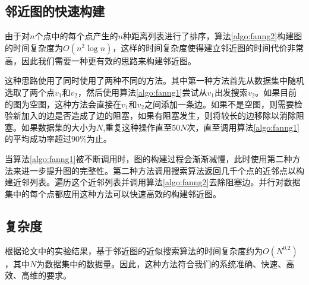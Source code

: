 \subsection{邻近图的快速构建}

由于对$n$个点中的每个点产生的$n$种距离列表进行了排序，算法\ref{algo:fanng2}构建图的时间复杂度为$O(n^2\log{n})$，这样的时间复杂度使得建立邻近图的时间代价非常高，因此我们需要一种更有效的思路来构建邻近图。

这种思路使用了同时使用了两种不同的方法。其中第一种方法首先从数据集中随机选取了两个点$v_1$和$v_2$，然后使用算法\ref{algo:fanng1}尝试从$v_1$出发搜索$v_2$。如果目前的图为空图，这种方法会直接在$v_1$和$v_2$之间添加一条边。如果不是空图，则需要检验新加入的边是否造成了边的阻塞，如果有阻塞发生，则将较长的边移除以消除阻塞。如果数据集的大小为$N$,重复这种操作直至$50N$次，直至调用算法\ref{algo:fanng1}的平均成功率超过$90\%$为止。

当算法\ref{algo:fanng1}被不断调用时，图的构建过程会渐渐减慢，此时使用第二种方法来进一步提升图的完整性。第二种方法调用搜索算法返回几千个点的近邻点以构建近邻列表。遍历这个近邻列表并调用算法\ref{algo:fanng2}去除阻塞边。并行对数据集中的每个点都应用这种方法可以快速高效的构建邻近图。

\subsection{复杂度}

根据论文\parencite{harwood2016fanng}中的实验结果，基于邻近图的近似搜索算法的时间复杂度约为$O(N^{0.2})$，其中$N$为数据集中的数据量。因此，这种方法符合我们的系统准确、快速、高效、高维的要求。


